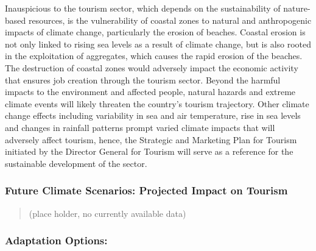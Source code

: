 \documentclass[
]{book}
\begin{document}
Inauspicious to the tourism sector, which depends on the sustainability of nature-based resources, is the vulnerability of coastal zones to natural and anthropogenic impacts of climate change, particularly the erosion of beaches. Coastal erosion is not only linked to rising sea levels as a result of climate change, but is also rooted in the exploitation of aggregates, which causes the rapid erosion of the beaches. The destruction of coastal zones would adversely impact the economic activity that ensures job creation through the tourism sector. Beyond the harmful impacts to the environment and affected people, natural hazards and extreme climate events will likely threaten the country's tourism trajectory. Other climate change effects including variability in sea and air temperature, rise in sea levels and changes in rainfall patterns prompt varied climate impacts that will adversely affect tourism, hence, the Strategic and Marketing Plan for Tourism initiated by the Director General for Tourism will serve as a reference for the sustainable development of the sector.

\hypertarget{future-climate-scenarios-projected-impact-on-tourism}{%
\subsubsection{Future Climate Scenarios: Projected Impact on Tourism}\label{future-climate-scenarios-projected-impact-on-tourism}}

\begin{quote}
(place holder, no currently available data)
\end{quote}

\hypertarget{adaptation-options-2}{%
\subsubsection{Adaptation Options:}\label{adaptation-options-2}}
\end{document}
